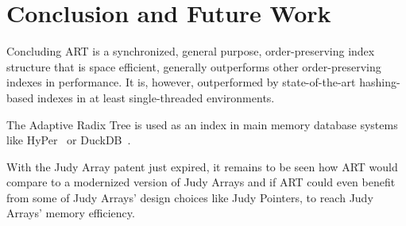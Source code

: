 \documentclass[acmtog, nonacm]{acmart}
\begin{document}
\section{Conclusion and Future Work}

Concluding ART is a synchronized, general purpose, order-preserving index structure that is space efficient, 
generally outperforms other order-preserving indexes in performance.
It is, however, outperformed by state-of-the-art hashing-based indexes in at least single-threaded environments.

The Adaptive Radix Tree is used as an index in main memory database systems like HyPer~\cite{5767867} or DuckDB~\cite{10.1145/3299869.3320212}.

With the Judy Array patent just expired, it remains to be seen how ART would compare to a modernized version of
Judy Arrays and if ART could even benefit from some of Judy Arrays' design choices like Judy Pointers, to reach 
Judy Arrays' memory efficiency.



\end{document}
